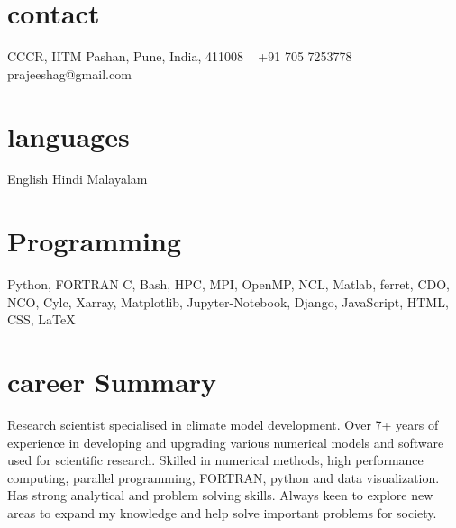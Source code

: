 \documentclass[]{cv-style}          %
\begin{document}
\lastupdated


\begin{aside}
%
\section{contact}
CCCR, IITM
Pashan, Pune,
India, 411008
~
+91 705 7253778
~
prajeeshag@gmail.com
%
\section{languages}
English
Hindi
Malayalam
%
\section{Programming}
    Python, FORTRAN
    C, Bash, HPC, MPI, OpenMP, NCL, Matlab, ferret, CDO, NCO, Cylc, Xarray, Matplotlib, Jupyter-Notebook, Django, JavaScript, HTML, CSS, \LaTeX{}
%
\end{aside}

\section{career Summary}
  \vspace{-0.2cm}
Research scientist specialised in climate model development. Over 7+ years of experience in developing and upgrading various numerical models and software used for scientific research. Skilled in numerical methods, high performance computing, parallel programming, FORTRAN, python and data visualization. Has strong analytical and problem solving skills. Always keen to explore new areas to expand my knowledge and help solve important problems for society.
\end{document}
